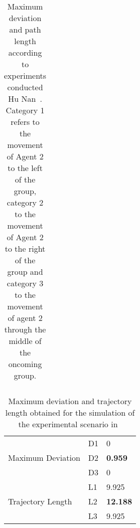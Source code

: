 \begin{table}[h]
\begin{tabular}{p{1.25in}   p{0.75in}   p{0.75in} p{0.75in} p{0.75in}}
            \hline
            \hline
        \end{tabular}
    \caption{Maximum deviation and path length according to experiments conducted Hu Nan~\cite{HuNanThesis}. Category 1 refers to the movement of Agent 2 to the left of the group, category 2 to the movement of Agent 2 to the right of the group and category 3 to the movement of agent 2 through the middle of the oncoming group.}
    \label{tab:RealWorldDistanceDeviation}
\end{table}

\begin{table}[h]
\label{tab:RealWorldDistanceDeviation}
\centering
        \begin{tabular}{p{1.5in}   p{0.75in}   p{0.75in}}
            \hline
            \multirow{3}{1.5in}{Maximum Deviation} & \multicolumn{1}{l}{D1} & \multicolumn{1}{l}{0}
            \\%
                                    & \multicolumn{1}{l}{D2} & \multicolumn{1}{l}{\textbf{0.959}}
            \\%
                                    & \multicolumn{1}{l}{D3} & \multicolumn{1}{l}{0}
            \\%

            \hline

            \multirow{3}{1.5in}{Trajectory Length} & \multicolumn{1}{l}{L1} & \multicolumn{1}{l}{9.925}
            \\%
                                    & \multicolumn{1}{l}{L2} & \multicolumn{1}{l}{\textbf{12.188}}
            \\%
                                    & \multicolumn{1}{l}{L3} & \multicolumn{1}{l}{9.925}
            \\%

            \hline
            \hline
        \end{tabular}
    \caption{Maximum deviation and trajectory length obtained for the simulation of the experimental scenario in~\cite{HuNanThesis}}
    \label{tab:IBPDistanceDeviation}
\end{table}

